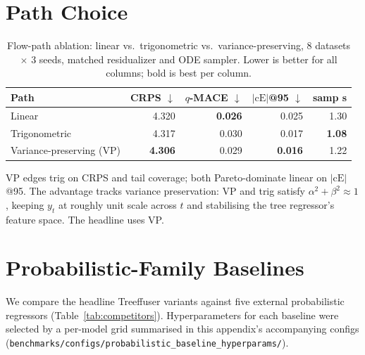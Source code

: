\documentclass{uai2026}
\begin{document}
\section{Path Choice}\label{app:path}

\begin{table}[!h]
  \centering
  \caption{Flow-path ablation: linear vs.\ trigonometric vs.\ variance-preserving, 8 datasets $\times$ 3 seeds, matched residualizer and ODE sampler. Lower is better for all columns; bold is best per column.}\label{tab:path}
  \footnotesize
  \begin{tabular}{lrrrr}
    \toprule
    Path & CRPS $\downarrow$ & $q$-MACE $\downarrow$ & $|\text{cE}|$@95 $\downarrow$ & samp s \\
    \midrule
    Linear         & 4.320 & \textbf{0.026} & 0.025 & 1.30 \\
    Trigonometric  & 4.317 & 0.030 & 0.017 & \textbf{1.08} \\
    Variance-preserving (VP) & \textbf{4.306} & 0.029 & \textbf{0.016} & 1.22 \\
    \bottomrule
  \end{tabular}
\end{table}

VP edges trig on CRPS and tail coverage; both Pareto-dominate linear on $|\text{cE}|$@95. The advantage tracks variance preservation: VP and trig satisfy $\alpha^2+\beta^2 \approx 1$, keeping $y_t$ at roughly unit scale across $t$ and stabilising the tree regressor's feature space. The headline uses VP.

\section{Probabilistic-Family Baselines}\label{app:competitors}

We compare the headline Treeffuser variants against five external probabilistic regressors (Table~\ref{tab:competitors}). Hyperparameters for each baseline were selected by a per-model grid summarised in this appendix's accompanying configs (\texttt{benchmarks/configs/probabilistic\_baseline\_hyperparams/}).
\end{document}
